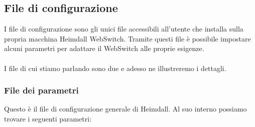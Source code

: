 \documentclass[italian]{tktltiki2}
\begin{document}
\subsection{File di configurazione}
\label{sec:config}
I file di configurazione sono gli unici file accessibili all'utente che installa sulla propria macchina Heimdall WebSwitch. Tramite questi file è possibile impostare alcuni parametri per adattare il WebSwitch alle proprie esigenze.
\\
\\
I file di cui stiamo parlando sono due e adesso ne illustreremo i dettagli.
\subsubsection{File dei parametri}
\label{sec:config_parser}
Questo è il file di configurazione generale di Heimdall. Al suo interno possiamo trovare i seguenti parametri:
\end{document}
